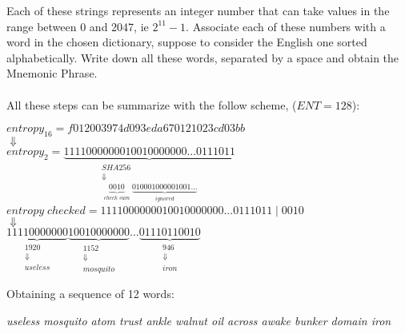 Each of these strings represents an integer number that can take values in the range between 0 and 2047, ie $2^{11}-1$. Associate each of these numbers with a word in the chosen dictionary, suppose to consider the English one sorted alphabetically. Write down all these words, separated by a space and obtain the Mnemonic Phrase.
\\ \\
All these steps can be summarize with the follow scheme, ($ENT=128$):
\begin{center} 
	$ entropy_{16} = f012003974d093eda670121023cd03bb $ 
	\\
	$\Downarrow $
	\\
	$entropy_{2}= \underbrace{1111000000010010000000...0111011}_{\substack{SHA256\\ \Downarrow\\ \underbrace{0010}_{\substack{check \;sum}}\underbrace{010001000001001...}_{\substack{ignored}}} } $
	\\
	$ $
	\\
	$entropy\;checked = 11110000000 10010000000...0111011\; | \; 0010$
	\\
	$\Downarrow $
	\\
	$\underbrace{11110000000}_{\substack{1920 \\ \Downarrow\\ useless} }
	\underbrace{10010000000}_{\substack{1152 \\ \Downarrow\\ mosquito}}
	...
	\underbrace{01110110010}_{\substack{946 \\ \Downarrow\\ iron}}
	$
\end{center}
Obtaining a sequence of 12 words:
\begin{center}
	\textit{useless mosquito atom trust ankle walnut oil across awake bunker domain iron}
\end{center}


